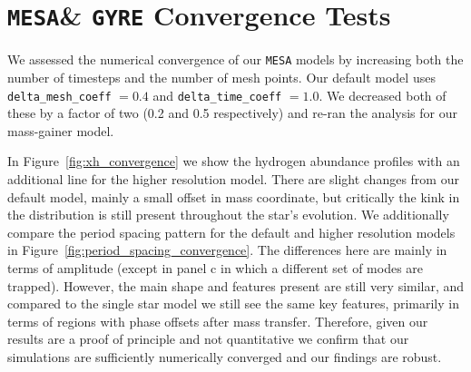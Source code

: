 \documentclass[twocolumn, twocolappendix, oneside]{aastex631}
\newcommand{\mesa}{\texttt{MESA}\xspace}
\newcommand{\gyre}{\texttt{GYRE}\xspace}
\begin{document}
\section{\mesa \& \gyre Convergence Tests}\label{app:convergence_tests}

We assessed the numerical convergence of our \mesa models by increasing both the number of timesteps and the number of mesh points. Our default model uses \texttt{delta\_mesh\_coeff} $ = 0.4$ and \texttt{delta\_time\_coeff} $ = 1.0$. We decreased both of these by a factor of two (0.2 and 0.5 respectively) and re-ran the analysis for our mass-gainer model.

In Figure~\ref{fig:xh_convergence} we show the hydrogen abundance profiles with an additional line for the higher resolution model. There are slight changes from our default model, mainly a small offset in mass coordinate, but critically the kink in the distribution is still present throughout the star's evolution. We additionally compare the period spacing pattern for the default and higher resolution models in Figure~\ref{fig:period_spacing_convergence}. The differences here are mainly in terms of amplitude (except in panel c in which a different set of modes are trapped). However, the main shape and features present are still very similar, and compared to the single star model we still see the same key features, primarily in terms of regions with phase offsets after mass transfer. Therefore, given our results are a proof of principle and not quantitative we confirm that our simulations are sufficiently numerically converged and our findings are robust.
\end{document}
